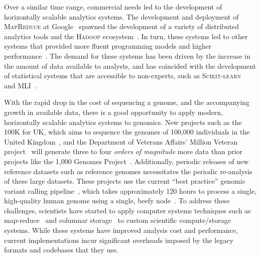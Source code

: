 \documentclass[11pt]{article} %
\begin{document}
Over a similar time range, commercial needs led to the development of horizontally scalable
analytics systems. The development and deployment of \textsc{MapReduce} at
Google~\cite{dean04, dean08} spawned the development of a variety of distributed analytics tools
and the \textsc{Hadoop} ecosystem~\cite{hadoop}. In turn, these systems led to other systems
that provided more fluent programming models and higher performance~\cite{zaharia10}.
The demand for these systems has been driven by the increase in the amount of data available to
analysts, and has coincided with the development of statistical systems that are accessible to
non-experts, such as \textsc{Scikit-learn}~\cite{pedregosa11} and \textsc{MLI}~\cite{sparks13}.

With the rapid drop in the cost of sequencing a genome, and the accompanying growth in available data,
there is a good opportunity to apply modern, horizontally scalable analytics systems to genomics. New
projects such as the 100K for UK, which aims to sequence the genomes of 100,000 individuals in the
United Kingdom~\cite{uk100k}, and the Department of Veterans Affairs' Million Veteran project~\cite{mvp}
will generate three to four \emph{orders of magnitude} more data than prior projects like the 1,000
Genomes Project~\cite{siva08}. Additionally, periodic releases of new reference datasets such as reference
genomes necessitates the periodic re-analysis of these large datasets. These projects use the current ``best
practice'' genomic variant calling pipeline~\cite{auwera13}, which takes approximately 120 hours to
process a single, high-quality human genome using a single, beefy node~\cite{talwalkar14}. To address
these challenges, scientists have started to apply computer systems techniques such as
map-reduce~\cite{langmead09, mckenna10, schatz09} and columnar storage~\cite{fritz11} to custom
scientific compute/storage systems. While these systems have improved analysis cost and performance,
current implementations incur significant overheads imposed by the legacy formats and codebases that
they use.
\end{document}
